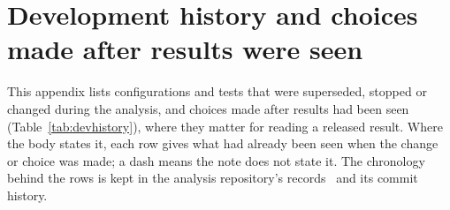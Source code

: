 \section{Development history and choices made after results were seen}
\label{app:devhistory}

This appendix lists configurations and tests that were superseded, stopped or changed during the analysis, and choices made after results had been seen (Table~\ref{tab:devhistory}), where they matter for reading a released result. Where the body states it, each row gives what had already been seen when the change or choice was made; a dash means the note does not state it. The chronology behind the rows is kept in the analysis repository's records~\cite{NoteRecords2026} and its commit history.

